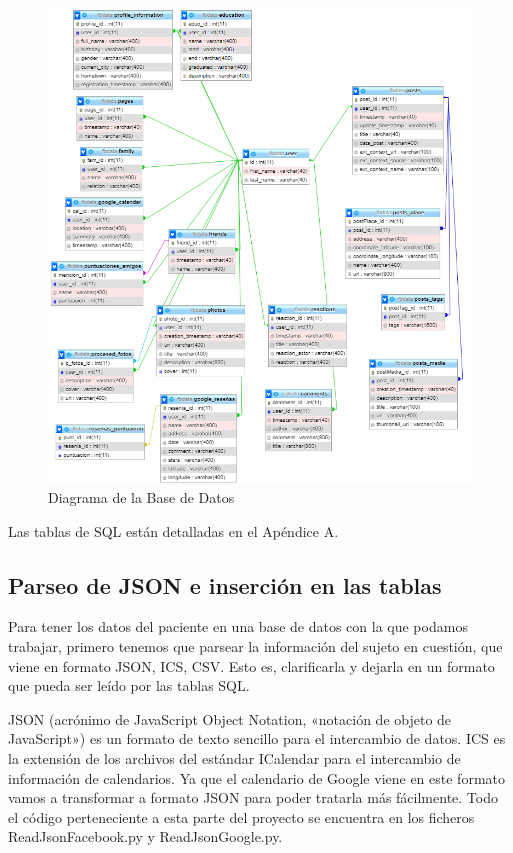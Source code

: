 \begin{figure}
	\includegraphics[scale=0.8]{Imagenes/Fuentes/DiagramaBDSQL.png}
	\caption{Diagrama de la Base de Datos}
	\label{DiagramaBDSQL}
\end{figure}
Las tablas de SQL están detalladas en el Apéndice A. 

\subsection{Parseo de JSON e inserción en las tablas}

Para tener los datos del paciente en una base de datos con la que podamos trabajar, primero tenemos que parsear la información del sujeto en cuestión, que viene en formato JSON, ICS, CSV. Esto es, clarificarla y dejarla en un formato que pueda ser leído por las tablas SQL.

JSON (acrónimo de JavaScript Object Notation, «notación de objeto de JavaScript») es un formato de texto sencillo para el intercambio de datos.
ICS es la extensión de los archivos del estándar ICalendar para el intercambio de información de calendarios. Ya que el calendario de Google viene en este formato vamos a transformar a formato JSON para poder tratarla más fácilmente. 
Todo el código perteneciente a esta parte del proyecto se encuentra en los ficheros ReadJsonFacebook.py y ReadJsonGoogle.py.

